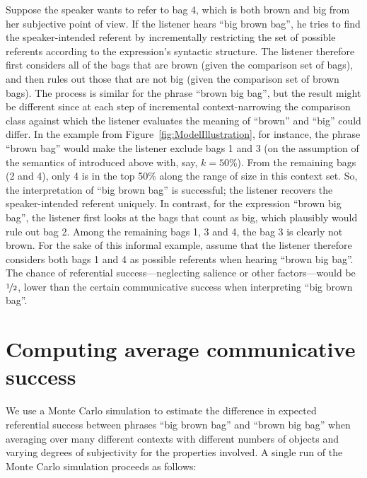 \documentclass[10pt,a4paper]{article}
\begin{document}
Suppose the speaker wants to refer to bag 4, which is both brown and big from her subjective point of view. If the listener hears ``big brown bag'', he tries to find the speaker-intended referent by incrementally restricting the set of possible referents according to the expression's syntactic structure. The listener therefore first considers all of the bags that are brown (given the comparison set of bags), and then rules out those that are not big (given the comparison set of brown bags). The process is similar for the phrase ``brown big bag'', but the result might be different since at each step of incremental context-narrowing the comparison class against which the listener evaluates the meaning of ``brown'' and ``big'' could differ. In the example from Figure~\ref{fig:ModelIllustration}, for instance, the phrase ``brown bag'' would make the listener exclude bags 1 and 3 (on the assumption of the semantics of  introduced above with, say, $k = 50\%$). From the remaining bags (2 and 4), only 4 is in the top 50\% along the range of size in this context set. So, the interpretation of ``big brown bag'' is successful; the listener recovers the speaker-intended referent uniquely. In contrast, for the expression ``brown big bag'', the listener first looks at the bags that count as big, which plausibly would rule out bag 2. Among the remaining bags 1, 3 and 4, the bag 3 is clearly not brown. For the sake of this informal example, assume that the listener therefore considers both bags 1 and 4 as possible referents when hearing ``brown big bag''. The chance of referential success---neglecting salience or other factors---would be $\nicefrac{1}{2}$, lower than the certain communicative success when interpreting ``big brown bag''.


\section{Computing average communicative success}

We use a Monte Carlo simulation to estimate the difference in expected referential success between phrases ``big brown bag'' and ``brown big bag'' when averaging over many different contexts with different numbers of objects and varying degrees of subjectivity for the properties involved. A single run of the Monte Carlo simulation proceeds as follows:
\end{document}

